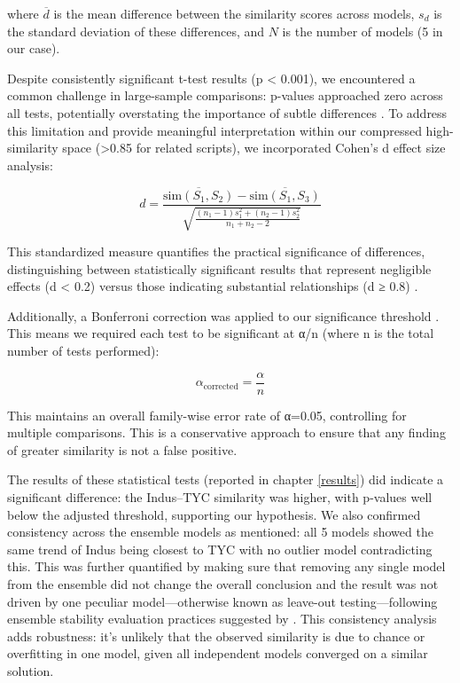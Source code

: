 \documentclass[11pt,a4paper,oneside]{report}
\begin{document}
where $\overline{d}$ is the mean difference between the similarity scores across models, $s_d$ is the standard deviation of these differences, and $N$ is the number of models (5 in our case).

Despite consistently significant t-test results (p < 0.001), we encountered a common challenge in large-sample comparisons: p-values approached zero across all tests, potentially overstating the importance of subtle differences \cite{sullivan_using_2012}. To address this limitation and provide meaningful interpretation within our compressed high-similarity space (>0.85 for related scripts), we incorporated Cohen's d effect size analysis:

\begin{equation}
d = \frac{\overline{\text{sim}(S_1, S_2)} - \overline{\text{sim}(S_1, S_3)}}{\sqrt{\frac{(n_1-1)s_1^2 + (n_2-1)s_2^2}{n_1 + n_2 - 2}}}
\end{equation}

This standardized measure quantifies the practical significance of differences, distinguishing between statistically significant results that represent negligible effects (d < 0.2) versus those indicating substantial relationships (d ≥ 0.8) \cite{cohen_statistical_1988}.

Additionally, a Bonferroni correction was applied to our significance threshold \cite{bland_multiple_1995, bonferroni_teoria_1936}. This means we required each test to be significant at α/n (where n is the total number of tests performed):

\begin{equation}
\alpha_{\text{corrected}} = \frac{\alpha}{n}
\end{equation}

This maintains an overall family-wise error rate of α=0.05, controlling for multiple comparisons. This is a conservative approach to ensure that any finding of greater similarity is not a false positive.

The results of these statistical tests (reported in chapter \ref{results}) did indicate a significant difference: the Indus–TYC similarity was higher, with p-values well below the adjusted threshold, supporting our hypothesis. We also confirmed consistency across the ensemble models as mentioned: all 5 models showed the same trend of Indus being closest to TYC with no outlier model contradicting this. This was further quantified by making sure that removing any single model from the ensemble did not change the overall conclusion and the result was not driven by one peculiar model—otherwise known as leave-out testing—following ensemble stability evaluation practices suggested by \cite{fort_deep_2019}. This consistency analysis adds robustness: it's unlikely that the observed similarity is due to chance or overfitting in one model, given all independent models converged on a similar solution.
\end{document}
